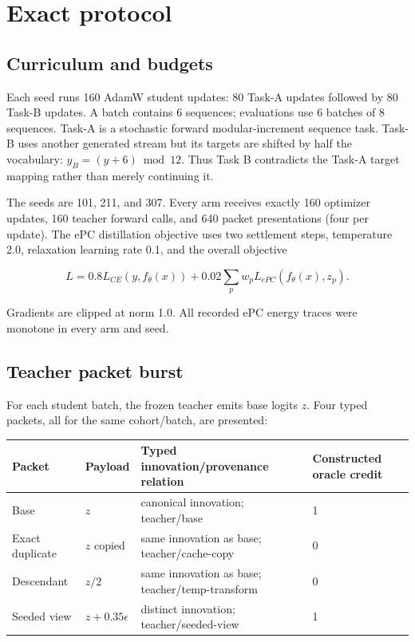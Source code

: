 \documentclass[10pt]{article}
\begin{document}
\section*{Exact protocol}

\subsection*{Curriculum and budgets}

Each seed runs 160 AdamW student updates: 80 Task-A updates followed by 80
Task-B updates. A batch contains 6 sequences; evaluations use 6 batches of 8
sequences. Task-A is a stochastic forward modular-increment sequence task.
Task-B uses another generated stream but its targets are shifted by half the
vocabulary: $y_B=(y+6)\bmod 12$. Thus Task B contradicts the Task-A target
mapping rather than merely continuing it.

The seeds are 101, 211, and 307. Every arm receives exactly 160 optimizer
updates, 160 teacher forward calls, and 640 packet presentations (four per
update). The ePC distillation objective uses two settlement steps,
temperature 2.0, relaxation learning rate 0.1, and the overall objective

\[
  L = 0.8 L_{CE}(y, f_\theta(x)) + 0.02 \sum_p w_p L_{ePC}(f_\theta(x),z_p).
\]

Gradients are clipped at norm 1.0. All recorded ePC energy traces were
monotone in every arm and seed.

\subsection*{Teacher packet burst}

For each student batch, the frozen teacher emits base logits $z$. Four typed
packets, all for the same cohort/batch, are presented:

\begin{center}
\begin{tabularx}{\linewidth}{lYYY}
\toprule
Packet & Payload & Typed innovation/provenance relation & Constructed oracle credit \\
\midrule
Base & $z$ & canonical innovation; teacher/base & 1 \\
Exact duplicate & $z$ copied & same innovation as base; teacher/cache-copy & 0 \\
Descendant & $z/2$ & same innovation as base; teacher/temp-transform & 0 \\
Seeded view & $z+0.35\epsilon$ & distinct innovation; teacher/seeded-view & 1 \\
\bottomrule
\end{tabularx}
\end{center}
\end{document}
